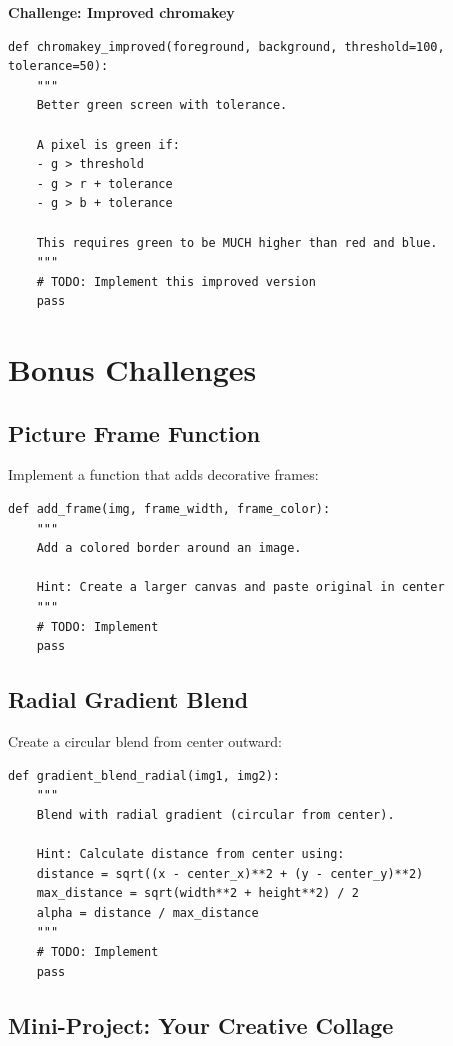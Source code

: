 \documentclass[11pt]{article}
\begin{document}
\textbf{Challenge: Improved chromakey}

\begin{lstlisting}
def chromakey_improved(foreground, background, threshold=100, tolerance=50):
    """
    Better green screen with tolerance.

    A pixel is green if:
    - g > threshold
    - g > r + tolerance
    - g > b + tolerance

    This requires green to be MUCH higher than red and blue.
    """
    # TODO: Implement this improved version
    pass
\end{lstlisting}

\section{Bonus Challenges}

\subsection{Picture Frame Function}

Implement a function that adds decorative frames:

\begin{lstlisting}
def add_frame(img, frame_width, frame_color):
    """
    Add a colored border around an image.

    Hint: Create a larger canvas and paste original in center
    """
    # TODO: Implement
    pass
\end{lstlisting}

\subsection{Radial Gradient Blend}

Create a circular blend from center outward:

\begin{lstlisting}
def gradient_blend_radial(img1, img2):
    """
    Blend with radial gradient (circular from center).

    Hint: Calculate distance from center using:
    distance = sqrt((x - center_x)**2 + (y - center_y)**2)
    max_distance = sqrt(width**2 + height**2) / 2
    alpha = distance / max_distance
    """
    # TODO: Implement
    pass
\end{lstlisting}

\subsection{Mini-Project: Your Creative Collage}
\end{document}
